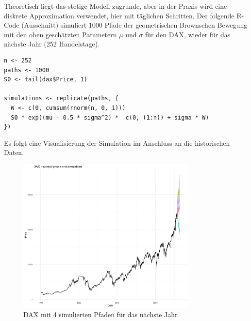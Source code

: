 \begin{bsp}
Theoretisch liegt das stetige Modell zugrunde, 
aber in der Praxis wird eine diskrete Approximation verwendet, hier mit täglichen Schritten.
Der folgende R-Code (Ausschnitt) simuliert 1000 Pfade der geometrischen Brownschen Bewegung
mit den oben geschätzten Parametern $\mu$ und $\sigma$ für den DAX, wieder für das nächste Jahr (252 Handelstage).

\begin{lstlisting}
n <- 252
paths <- 1000
S0 <- tail(dax$Price, 1)

simulations <- replicate(paths, {
  W <- c(0, cumsum(rnorm(n, 0, 1)))
  S0 * exp((mu - 0.5 * sigma^2) *  c(0, (1:n)) + sigma * W)
})
\end{lstlisting}
Es folgt eine Visualisierung der Simulation im Anschluss an die historischen Daten.

\begin{figure}[H]
    \centering
    \includegraphics[width=0.8\textwidth]{images/dax_monte_carlo.png}
    \caption{DAX mit 4 simulierten Pfaden für das nächste Jahr}
    \label{fig:dax_monte_carlo}
\end{figure}

\end{bsp}

